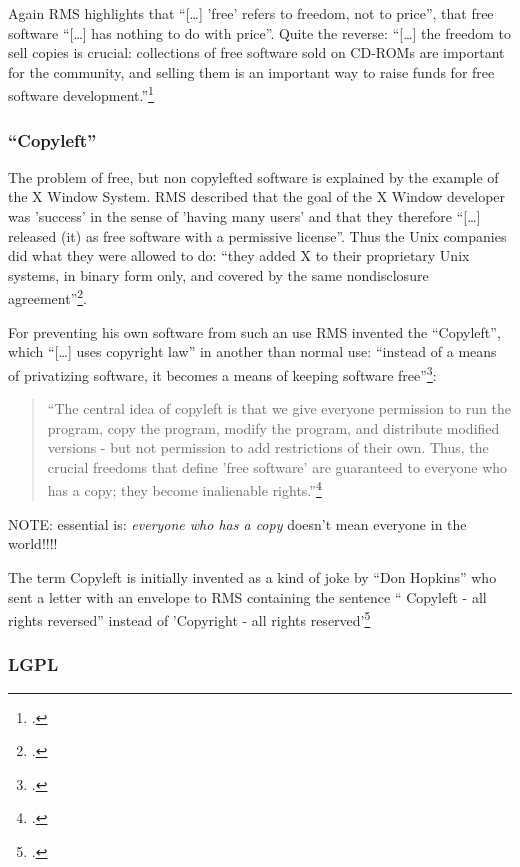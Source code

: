 \documentclass[DIV=calc,BCOR=5mm,11pt,headings=small,oneside,abstract=true, toc=bib]{scrartcl}
\begin{document}
Again RMS highlights that \enquote{[\ldots] ’free’ refers to freedom, not to
price}, that free software \enquote{[\ldots] has nothing to do with
price}. Quite the reverse: \enquote{[\ldots] the freedom to sell copies is
crucial: collections of free software sold on CD-ROMs are important for the
community, and selling them is an important way to raise funds for free software
development.}\footcite[cf][18]{Stallman1999a} 

\subsubsection{\enquote{Copyleft}}
The problem of free, but non copylefted software is explained by the example of
the X Window System. RMS described that the goal of the X Window developer was
’success’ in the sense of ’having many users’ and that they therefore
\enquote{[\ldots] released (it) as free software with a permissive license}.
Thus the Unix companies did what they were allowed to do: \enquote{they added X to
their proprietary Unix systems, in binary form only, and covered by the same
nondisclosure agreement}\footcite[cf][20]{Stallman1999a}. 

For preventing his own software from such an use RMS invented the
\enquote{Copyleft}, which \enquote{[\ldots] uses copyright law} in
another than normal use: \enquote{instead of a means of privatizing software, it
becomes a means of keeping software free}\footcite[cf][20]{Stallman1999a}:
\begin{quote}\enquote{The central idea of copyleft is that we give everyone
permission to run the program, copy the program, modify the program, and
distribute modified versions - but not permission to add restrictions of their
own. Thus, the crucial freedoms that define ’free software’ are guaranteed to
everyone who has a copy; they become inalienable
rights.}\footcite[cf][20]{Stallman1999a}
\end{quote}

NOTE: essential is: \emph{everyone who has a copy} doesn’t mean everyone
in the world!!!!

The term Copyleft is initially invented as a kind of joke by \enquote{Don
Hopkins} who sent a letter with an envelope to RMS containing the sentence
\enquote{ Copyleft - all rights reversed} instead of ’Copyright - all rights
reserved’\footcite[cf][21]{Stallman1999a} 


\subsubsection{LGPL}
\end{document}
